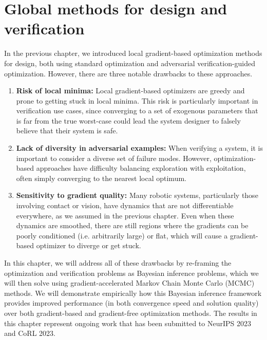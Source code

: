 
\section{Global methods for design and verification}\label{section:global_methods}

In the previous chapter, we introduced local gradient-based optimization methods for design, both using standard optimization and adversarial verification-guided optimization. However, there are three notable drawbacks to these approaches.

\begin{enumerate}
    \item \textbf{Risk of local minima: } Local gradient-based optimizers are greedy and prone to getting stuck in local minima. This risk is particularly important in verification use cases, since converging to a set of exogenous parameters that is far from the true worst-case could lead the system designer to falsely believe that their system is safe.
    \item \textbf{Lack of diversity in adversarial examples: } When verifying a system, it is important to consider a diverse set of failure modes. However, optimization-based approaches have difficulty balancing exploration with exploitation, often simply converging to the nearest local optimum.
    \item \textbf{Sensitivity to gradient quality: } Many robotic systems, particularly those involving contact or vision, have dynamics that are not differentiable everywhere, as we assumed in the previous chapter. Even when these dynamics are smoothed, there are still regions where the gradients can be poorly conditioned (i.e. arbitrarily large) or flat, which will cause a gradient-based optimizer to diverge or get stuck.
\end{enumerate}

In this chapter, we will address all of these drawbacks by re-framing the optimization and verification problems as Bayesian inference problems, which we will then solve using gradient-accelerated Markov Chain Monte Carlo (MCMC) methods. We will demonstrate empirically how this Bayesian inference framework provides improved performance (in both convergence speed and solution quality) over both gradient-based and gradient-free optimization methods. The results in this chapter represent ongoing work that has been submitted to NeurIPS 2023 and CoRL 2023.


